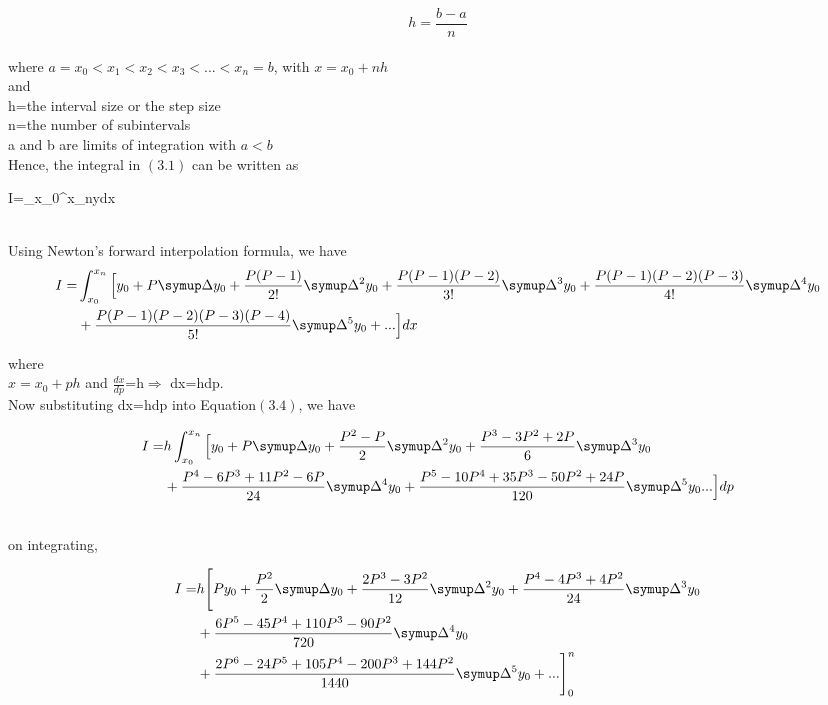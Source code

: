 \documentclass[a4paper,12pt]{report}
\numberwithin{equation}{section}
\begin{document}
\begin{equation}
h=\frac{b-a}{n}
\end{equation}
\\
where       $a=x_0<x_1<x_2<x_3<...<x_n=b$, with    $x=x_0+nh$\\
and\\
h=the interval size or the step size\\
n=the number of subintervals\\
a and b are limits of integration with $a<b$\\
Hence, the integral in $(3.1)$ can be written as 

\begin{center}

I=\int_{x_0}^{x_n}ydx    

\end{center}
\\
Using Newton's forward interpolation formula, we have\\

\begin{equation}
\begin{split}
I=&\int_{x_0}^{x_n}\Big[y_0+P\symup\Delta y_0+\frac{P(P-1)}{2!}\symup\Delta^2y_0+\frac{P(P-1)(P-2)}{3!}\symup\Delta^3y_0+\frac{P(P-1)(P-2)(P-3)}{4!}\symup\Delta^4y_0\\
&+\frac{P(P-1)(P-2)(P-3)(P-4)}{5!}\symup\Delta^5y_0+...\Big]dx
\end{split}
\end{equation}



where\\
$x=x_0+ph$ and $\frac{dx}{dp}$=h$\Rightarrow$ dx=hdp. \\
Now substituting dx=hdp into Equation$(3.4)$, we have

\begin{equation}
\begin{split}
I=&h\int_{x_0}^{x_n}\Big[y_0+P\symup\Delta y_0+\frac{P^2-P}{2}\symup\Delta^2y_0+\frac{P^3-3P^2+2P}{6}\symup\Delta^3y_0\\
&+\frac{P^4-6P^3+11P^2-6P}{24}\symup\Delta^4y_0+\frac{P^5-10P^4+35P^3-50P^2+24P}{120}\symup\Delta^5y_0...\Big]dp
\end{split}
\end{equation}

\\on integrating,

\begin{equation}
\begin{split}
I=&h\Bigg[Py_0+\frac{P^2}{2}\symup\Delta{y_0}+\frac{2P^3-3P^2}{12}\symup\Delta^2y_0+\frac{P^4-4P^3+4P^2}{24}\symup\Delta^3y_0\\ 
&+\frac{6P^5-45P^4+110P^3-90P^2}{720}\symup\Delta^4y_0\\
&+\frac{2P^6-24P^5+105P^4-200P^3+144P^2}{1440}\symup\Delta^5y_0+...\Bigg]_{0}^{n}
\end{split}
\end{equation}
\end{document}
